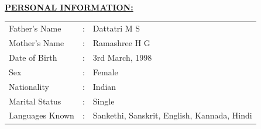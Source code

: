 \documentclass[letterpaper,11pt,oneside]{article}
\begin{document}
	
	\vspace{2ex}
	
	\textbf{\underline{\Large PERSONAL INFORMATION:}}\\
	
	\vspace{2ex}
	
	
	\begin{tabular}{l l l}
		
		Father’s Name &   :  &Dattatri M S\\ 
		Mother’s Name  & :  &Ramashree H G\\
		Date of Birth	&:  &3rd March, 1998\\
		Sex 			&:  &Female\\
		Nationality		&:  &Indian\\
		Marital Status 	&:  &Single\\
		Languages Known	&:  &Sankethi, Sanskrit, English, Kannada, Hindi\\
		
	\end{tabular}
	
\end{document}
